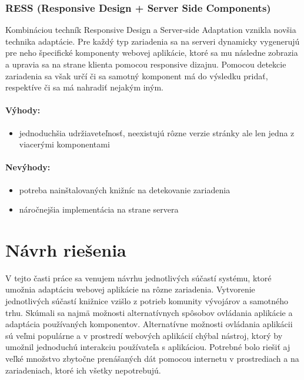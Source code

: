 
\subsubsection{RESS (Responsive Design + Server Side Components)} %
\label{ssub:ress_responsive_design_server_side_components_}

Kombináciou techník Responsive Design a Server-side Adaptation vznikla novšia technika adaptácie. Pre každý typ zariadenia sa na serveri dynamicky vygenerujú pre neho špecifické komponenty webovej aplikácie, ktoré sa mu následne zobrazia a upravia sa na strane klienta pomocou responsive dizajnu. Pomocou detekcie zariadenia sa však určí či sa samotný komponent má do výsledku pridať, respektíve či sa má nahradiť nejakým iným.

\paragraph{Výhody:}
\begin{itemize}
	\item jednoduchšia udržiaveteľnosť, neexistujú rôzne verzie stránky ale len jedna z viacerými komponentami
\end{itemize}

\paragraph{Nevýhody:}
\begin{itemize}
	\item potreba nainštalovaných knižníc na detekovanie zariadenia
	\item náročnejšia implementácia na strane servera
\end{itemize}



\newpage
\section{Návrh riešenia} %
\label{sec:n_stroj_na_overenie}

V tejto časti práce sa venujem návrhu jednotlivých súčastí systému, ktoré umožnia adaptáciu webovej aplikácie na rôzne zariadenia. Vytvorenie jednotlivých súčastí knižnice vzišlo z potrieb komunity vývojárov a samotného trhu. Skúmali sa najmä možnosti alternatívnych spôsobov ovládania aplikácie a adaptácia používaných komponentov. Alternatívne možnosti ovládania aplikácii sú veľmi populárne a v prostredí webových aplikácií chýbal nástroj, ktorý by umožnil jednoduchú interakciu používateľa s aplikáciou. Potrebné bolo riešiť aj veľké množstvo zbytočne prenášaných dát pomocou internetu v prostrediach a na zariadeniach, ktoré ich všetky nepotrebujú.

